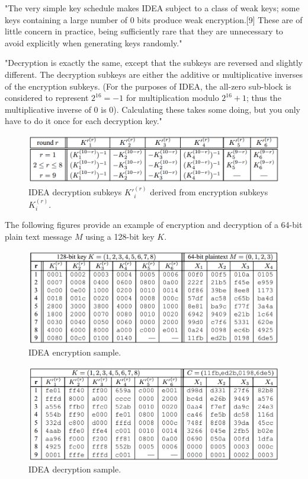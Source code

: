 \documentclass[a4paper,12pt,titlepage]{article}
\begin{document}
"The very simple key schedule makes IDEA subject to a class of weak keys; some keys containing a large number of 0 bits produce weak encryption.[9] These are of little concern in practice, being sufficiently rare that they are unnecessary to avoid explicitly when generating keys randomly." \citep{wiki:idea}

"Decryption is exactly the same, except that the subkeys are reversed and slightly different. The decryption subkeys are either the additive or multiplicative inverses of the encryption subkeys. (For the purposes of IDEA, the all-zero sub-block is considered to represent $2^{16} = -1$ for multiplication 
modulo $2^{16} + 1$; thus the multiplicative inverse of 0 is 0). Calculating these takes some doing, but you only have to do it once for each decryption key." \citep{schneier_applied_1996}

\begin{figure}[!ht]
	\centering
	\label{fig:idea-enc}
	\includegraphics[width=\textwidth]{idea-dec-subkeys.png}
	\caption{IDEA decryption subkeys ${K'}_i^{(r)}$ derived from encryption subkeys $K_i^{(r)}$. \citep{menezes_handbook_1996}}
\end{figure}

The following figures provide an example of encryption and decryption of a 64-bit plain text message $M$ using a 128-bit key $K$.

\begin{figure}[!ht]
	\centering
	\label{fig:idea-enc}
	\includegraphics[width=\textwidth]{idea-enc.png}
	\caption{IDEA encryption sample. \citep{menezes_handbook_1996}}
\end{figure}

\begin{figure}[!ht]
	\centering
	\label{fig:idea-dec}
	\includegraphics[width=\textwidth]{idea-dec.png}
	\caption{IDEA decryption sample. \citep{menezes_handbook_1996}}
\end{figure}

\newpage


\end{document}
